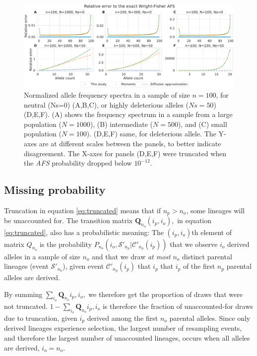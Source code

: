 \documentclass[review]{elsarticle}
\begin{document}
\begin{figure}
  \centering
  \includegraphics[width=0.7\textheight]{fig/strong_selection_six_panel.pdf}
  \caption{Normalized allele frequency spectra in a sample of size $n=100$, for neutral (Ns=0)
    (A,B,C), or highly deleterious alleles ($Ns=50$) (D,E,F). (A) shows the frequency spectrum in a
    sample from a large population ($N=1000$), (B) intermediate ($N=500$), and (C) small population
    ($N=100$). (D,E,F) same, for deleterious allele. The Y-axes are at different scales between the
    panels, to better indicate disagreement. The X-axes for panels (D,E,F) were truncated
    when the \textit{AFS} probability dropped below $10^{-12}$. }
  \label{fig:strong-selection}
\end{figure}

\subsection{Missing probability}
\label{subsec:missing}

Truncation in equation \ref{eq:truncated} means that if $n_p > n_o$, some lineages will be
unaccounted for. The transition matrix $\mathbf{Q}_{n_o}(i_p, i_o),$ in equation \eqref{eq:truncated}, also has a probabilistic 
meaning: 
The $(i_p,i_o)$th element of matrix $Q_{n_o}$  is the probability $P_{n_o}(i_o, \mathcal{S'}_{n_p}| \mathcal{C'}_{n_p}(i_p))$
  that we observe $i_o$ derived alleles in a sample of size $n_o$ and that we draw \emph{at most} $n_o$ distinct parental lineages (event $\mathcal{S'}_{n_o}$), 
  given event $\mathcal{C'}_{n_p}(i_p)$ that $i_p$ that $i_p$ of the first $n_p$ parental alleles are derived. 

By summing $\sum_{i_o} \mathbf{Q}_{n_o}{i_p, i_o},$ we therefore get the proportion of draws that were 
not truncated. $1-\sum_{i_o} \mathbf{Q}_{n_o}{i_p, i_o}$ is therefore the fraction of unaccounted-for draws 
due to truncation, given $i_p$ derived among the first $n_o$ parental alleles. Since only derived lineages experience selection,
 the largest number of resampling events, and therefore the largest number of unaccounted lineages, 
 occurs when all alleles are derived, $i_o = n_o$.
\end{document}
